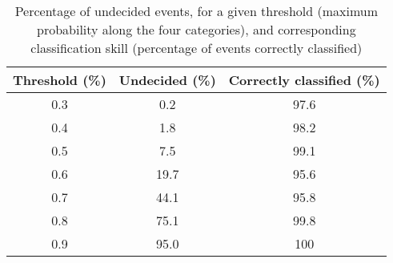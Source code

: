 \documentclass[draft,jgrga]{agutex}
\begin{document}
\begin{article}
\begin{table}[!ht]
\caption{Percentage of undecided events, for a given threshold (maximum probability along the four categories), and corresponding classification skill (percentage of events correctly classified)}\label{table:undecided}
\centering
\begin{tabular}{c c c}
\hline
 Threshold (\%) & Undecided (\%) & Correctly classified (\%)\\
\hline
 0.3 & 0.2 & 97.6 \\
 0.4 & 1.8 & 98.2 \\
 0.5 & 7.5 & 99.1 \\
 0.6 & 19.7 & 95.6 \\
 0.7 & 44.1 & 95.8 \\
 0.8 & 75.1 & 99.8 \\
 0.9 & 95.0 & 100 \\
 \hline
\end{tabular}
\end{table}


\end{article}
\end{document}
